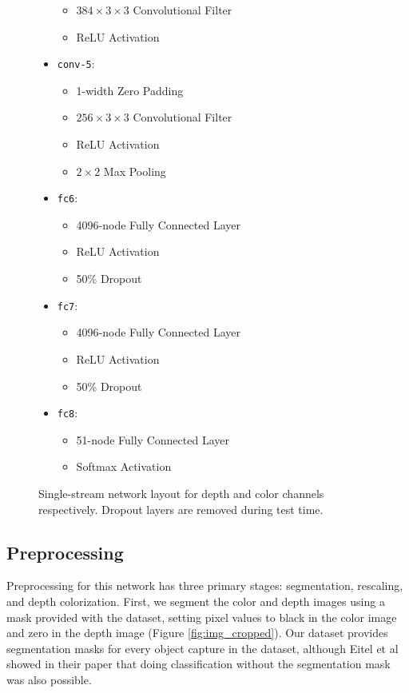 \begin{figure}
\begin{mdframed}
\begin{itemize}
\begin{itemize}
				\item $384 \times 3 \times 3$ Convolutional Filter
				\item ReLU Activation
			\end{itemize}
			\item \texttt{conv-5}:
			\begin{itemize}
				\item 1-width Zero Padding
				\item $256 \times 3 \times 3$ Convolutional Filter
				\item ReLU Activation
				\item $2 \times 2$ Max Pooling
			\end{itemize}
			\item \texttt{fc6}:
			\begin{itemize}
				\item 4096-node Fully Connected Layer
				\item ReLU Activation
				\item 50\% Dropout
			\end{itemize}
			\item \texttt{fc7}:
			\begin{itemize}
				\item 4096-node Fully Connected Layer
				\item ReLU Activation
				\item 50\% Dropout
			\end{itemize}
			\item \texttt{fc8}:
			\begin{itemize}
				\item 51-node Fully Connected Layer
				\item Softmax Activation
			\end{itemize}
		\end{itemize}
	\end{mdframed}
	\caption{Single-stream network layout for depth and color channels respectively. Dropout layers are removed during test time.}
	\label{fig:single_stream_layout}
\end{figure}


\subsection{Preprocessing}
\label{subsec:preprocessing}
Preprocessing for this network has three primary stages: segmentation, rescaling, and depth colorization. First, we segment the color and depth images using a mask provided with the dataset, setting pixel values to black in the color image and zero in the depth image (Figure \ref{fig:img_cropped}). Our dataset provides segmentation masks for every object capture in the dataset, although Eitel et al \cite{Eitel2015} showed in their paper that doing classification without the segmentation mask was also possible.

